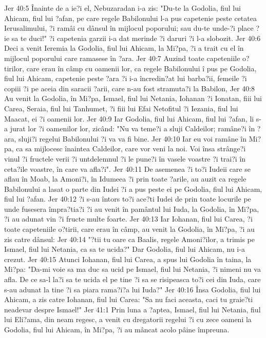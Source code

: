 Jer 40:5  Înainte de a ie?i el, Nebuzaradan i-a zis: "Du-te la Godolia, fiul lui Ahicam, fiul lui ?afan, pe care regele Babilonului l-a pus capetenie peste cetatea Ierusalimului, ?i ramâi cu dânsul în mijlocul poporului; sau du-te unde-?i place ?ie sa te duci!" ?i capetenia garzii i-a dat merinde ?i daruri ?i l-a slobozit.
Jer 40:6  Deci a venit Ieremia la Godolia, fiul lui Ahicam, la Mi?pa, ?i a trait cu el în mijlocul poporului care ramasese în ?ara.
Jer 40:7  Auzind toate capeteniile o?tirilor, care erau în câmp cu oamenii lor, ca regele Babilonului î pus pe Godolia, fiul lui Ahicam, capetenie peste ?ara ?i i-a încredin?at lui barba?ii, femeile ?i copiii ?i pe aceia din saracii ?arii, care n-au fost stramuta?i la Babilon,
Jer 40:8  Au venit la Godolia, în Mi?pa, Ismael, fiul lui Netania, Iohanan ?i Ionatan, fiii lui Carea, Seraia, fiul lui Tanhumet, ?i fiii lui Efai Netofitul ?i Iezania, fiul lui Maacat, ei ?i oamenii lor.
Jer 40:9  Iar Godolia, fiul lui Ahicam, fiul lui ?afan, li s-a jurat lor ?i oamenilor lor, zicând: "Nu va teme?i a sluji Caldeilor; ramâne?i în ?ara, sluji?i regelui Babilonului ?i va va fi bine.
Jer 40:10  Iar eu voi ramâne în Mi?pa, ca sa mijlocesc înaintea Caldeilor, care vor veni la noi. Voi însa strânge?i vinul ?i fructele verii ?i untdelemnul ?i le pune?i în vasele voastre ?i trai?i în ceta?ile voastre, în care va afla?i".
Jer 40:11  De asemenea ?i to?i Iudeii care se aflau în Moab, la Amoni?i, în Idumeea ?i prin toate ?arile, au auzit ca regele Babilonului a lasat o parte din Iudei ?i a pus peste ei pe Godolia, fiul lui Ahicam, fiul lui ?afan.
Jer 40:12  ?i s-au întors to?i ace?ti Iudei de prin toate locurile pe unde fusesera împra?tia?i ?i au venit în pamântul lui Iuda, la Godolia, în Mi?pa, ?i au adunat vin ?i fructe multe foarte.
Jer 40:13  Iar Iohanan, fiul lui Carea, ?i toate capeteniile o?tirii, care erau în câmp, au venit la Godolia, în Mi?pa, ?i au zis catre dânsul:
Jer 40:14  "?tii tu oare ca Baalis, regele Amoni?ilor, a trimis pe Ismael, fiul lui Netania, ca sa te ucida?" Dar Godolia, fiul lui Ahicam, nu i-a crezut.
Jer 40:15  Atunci Iohanan, fiul lui Carea, a spus lui Godolia în taina, la Mi?pa: "Da-mi voie sa ma duc sa ucid pe Ismael, fiul lui Netania, ?i nimeni nu va afla. De ce sa-l la?i sa te ucida el pe tine ?i sa se risipeasca to?i cei din Iuda, care s-au adunat la tine ?i sa piara rama?i?a lui Iuda?"
Jer 40:16  Însa Godolia, fiul lui Ahicam, a zis catre Iohanan, fiul lui Carea: "Sa nu faci aceasta, caci tu graie?ti neadevar despre Ismael!"
Jer 41:1  Prin luna a ?aptea, Ismael, fiul lui Netania, fiul lui Eli?ama, din neam regesc, a venit cu dregatorii regelui ?i cu zece oameni la Godolia, fiul lui Ahicam, în Mi?pa, ?i au mâncat acolo pâine împreuna.
